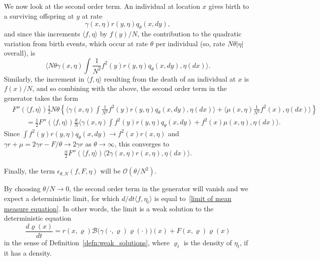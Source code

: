 \documentclass[12pt]{article}
\newcommand{\bigO}{\mathcal{O}}
\newcommand{\DG}{\mathcal{B}}  %
\begin{document}
We now look at the second order term.
An individual at location $x$ gives birth 
to a surviving offspring at $y$ at rate
$$
\gamma(x,\eta) r(y,\eta) q_{\theta}(x, dy) ,
$$
and since this increments $\langle f, \eta \rangle$ by $f(y) / N$,
the contribution to the quadratic variation from birth events,
which occur at rate $\theta$ per individual 
(so, rate $N\theta |\eta|$ overall), is
$$
\langle
    N \theta \gamma(x,\eta)
    \int \frac{1}{N^2} f^2(y) r(y,\eta)
    q_\theta(x,dy) 
    , \eta(dx)
\rangle .
$$
Similarly, the increment in $\langle f, \eta\rangle$ resulting from 
the death of an individual at $x$ is $f(x)/N$, and so combining with the 
above, the second order term in the generator takes the form
\begin{align*}
& F''(\langle f,\eta\rangle)
\frac{1}{2} N \theta
\left\{
    \langle
        \gamma(x,\eta)
        \int \frac{1}{N^2}f^2(y)r(y,\eta)q_\theta(x,dy) 
    , \eta(dx)\rangle
    +
    \langle
        \mu(x,\eta)\frac{1}{N^2}f^2(x) 
    ,\eta(dx)\rangle
\right\} \\
&\qquad
= \frac{1}{2} F''(\langle f, \eta \rangle)
    \frac{\theta}{N}
    \langle
        \gamma(x, \eta) \int f^2(y) r(y, \eta) q_\theta(x, dy) + f^2(x) \mu(x, \eta),
        \eta(dx)
    \rangle .
\end{align*}
Since $\int f^2(y) r(y, \eta) q_\theta(x, dy) \to f^2(x) r(x, \eta)$
and $\gamma r + \mu = 2 \gamma r - F / \theta \to 2 \gamma r$
as $\theta \to \infty$,
this converges to
\begin{align*}
\frac{\alpha}{2} F''(\langle f, \eta \rangle)
    \langle
        2 \gamma(x, \eta) r(x, \eta),
        \eta(dx)
    \rangle .
\end{align*}

Finally, the term $\epsilon_{\theta,N}(f, F, \eta)$ will be 
$\bigO(\theta/N^2)$.

By choosing $\theta/N \rightarrow 0$, the second order term in the generator 
will vanish and we expect a deterministic limit,
for which $d/dt \langle f, \eta_t \rangle$ is equal to~\eqref{limit of mean measure equation}.
In other words, the limit is a weak solution to the deterministic equation
\begin{equation}
\label{deterministic limit}
\frac{d\varrho(x)}{dt}
=
    r(x,\varrho)
    \DG\big(
        \gamma(\cdot,\varrho) \varrho(\cdot)
    \big)(x)
    + F(x, \varrho) \varrho(x) 
\end{equation}
in the sense of Definition~\ref{defn:weak_solutions},
where $\varrho_t$ is the density of $\eta_t$, if it has a density.
\end{document}
